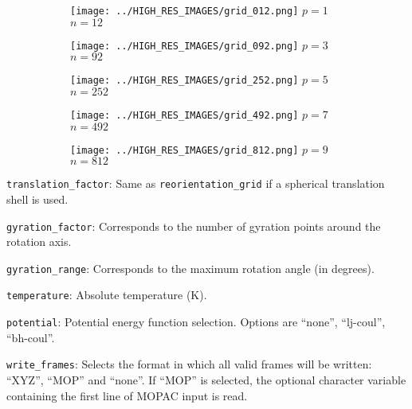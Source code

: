 \documentclass{achemso}
\begin{document}
\begin{figure}[!h]
  \begin{subfigure}[t]{0.18\textwidth}
    \center
    \texttt{[image: ../HIGH\_RES\_IMAGES/grid\_012.png]}
    \footnotesize
    $p = 1$ \\
    $n = 12$
  \end{subfigure}
  \begin{subfigure}[t]{0.18\textwidth}
    \center
    \texttt{[image: ../HIGH\_RES\_IMAGES/grid\_092.png]} 
    \footnotesize
    $p = 3$ \\
    $n = 92$
  \end{subfigure}
  \begin{subfigure}[t]{0.18\textwidth}
    \center
    \texttt{[image: ../HIGH\_RES\_IMAGES/grid\_252.png]} 
    \footnotesize
    $p = 5$ \\
    $n = 252$
  \end{subfigure}
  \begin{subfigure}[t]{0.18\textwidth}
    \center
    \texttt{[image: ../HIGH\_RES\_IMAGES/grid\_492.png]} 
    \footnotesize
    $p = 7$ \\
    $n = 492$
  \end{subfigure}
  \begin{subfigure}[t]{0.18\textwidth}
    \center
    \texttt{[image: ../HIGH\_RES\_IMAGES/grid\_812.png]} 
    \footnotesize
    $p = 9$ \\
    $n = 812$
  \end{subfigure}
\end{figure}

\texttt{translation\_factor}: Same as \texttt{reorientation\_grid} if a spherical
  translation shell is used.

\texttt{gyration\_factor}:  Corresponds to the number of gyration points around
  the rotation axis. 
  
\texttt{gyration\_range}: Corresponds to the maximum rotation angle (in degrees). 

\texttt{temperature}: Absolute temperature (K). 

\texttt{potential}: Potential energy function selection. Options are ``none'', 
  ``lj-coul'', ``bh-coul''. 

\texttt{write\_frames}: Selects the format in which all valid frames will be
  written: ``XYZ'', ``MOP'' and ``none''. If ``MOP'' is selected, the optional
  character variable containing the first line of MOPAC input is read. 
\end{document}
